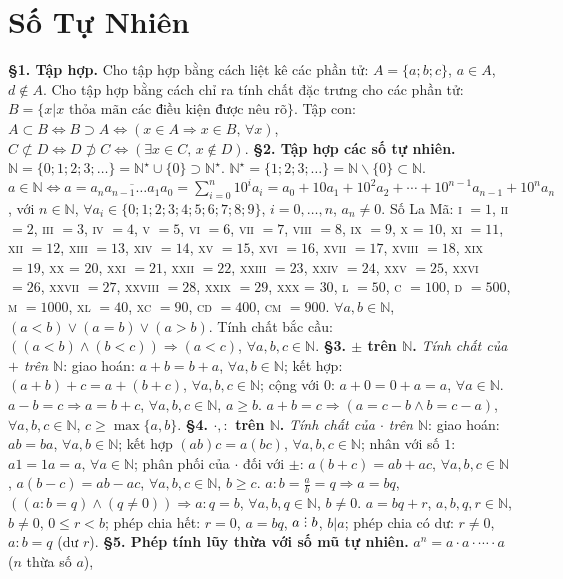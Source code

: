 \documentclass{article}
\DeclareRobustCommand{\divby}{%
	\mathrel{\vbox{\baselineskip.65ex\lineskiplimit0pt\hbox{.}\hbox{.}\hbox{.}}}%
}
\begin{document}
\section{Số Tự Nhiên}
\textbf{\S1. Tập hợp.} Cho tập hợp bằng cách liệt kê các phần tử: $A = \{a;b;c\}$, $a\in A$, $d\notin A$. Cho tập hợp bằng cách chỉ ra tính chất đặc trưng cho các phần tử: $B = \{x|x\mbox{ thỏa mãn các điều kiện được nêu rõ}\}$. Tập con: $A\subset B\Leftrightarrow B\supset A\Leftrightarrow(x\in A\Rightarrow x\in B,\,\forall x)$, $C\not\subset D\Leftrightarrow D\not\supset C\Leftrightarrow(\exists x\in C,\,x\notin D)$. \textbf{\S2. Tập hợp các số tự nhiên.} $\mathbb{N} = \{0;1;2;3;\ldots\} = \mathbb{N}^\star\cup\{0\}\supset\mathbb{N}^\star$. $\mathbb{N}^\star = \{1;2;3;\ldots\} = \mathbb{N}\backslash\{0\}\subset\mathbb{N}$. $a\in\mathbb{N}\Leftrightarrow a = \overline{a_na_{n-1}\ldots a_1a_0} = \sum_{i=0}^n 10^ia_i = a_0 + 10a_1 + 10^2a_2 + \cdots + 10^{n-1}a_{n-1} + 10^na_n$, với $n\in\mathbb{N}$, $\forall a_i\in\{0;1;2;3;4;5;6;7;8;9\}$, $i = 0,\ldots,n$, $a_n\ne 0$. Số La Mã: \textsc{i} $= 1$, \textsc{ii} $= 2$, \textsc{iii} $= 3$, \textsc{iv} $= 4$, \textsc{v} $= 5$, \textsc{vi} $= 6$, \textsc{vii} $= 7$, \textsc{viii} $= 8$, \textsc{ix} $= 9$, \textsc{x} = $10$, \textsc{xi} $= 11$, \textsc{xii} $= 12$, \textsc{xiii} $= 13$, \textsc{xiv} $= 14$, \textsc{xv} $= 15$, \textsc{xvi} $= 16$, \textsc{xvii} $= 17$, \textsc{xviii} $= 18$, \textsc{xix} $= 19$, \textsc{xx} = $20$, \textsc{xxi} $= 21$, \textsc{xxii} $= 22$, \textsc{xxiii} $= 23$, \textsc{xxiv} $= 24$, \textsc{xxv} $= 25$, \textsc{xxvi} $= 26$, \textsc{xxvii} $= 27$, \textsc{xxviii} $= 28$, \textsc{xxix} $= 29$, \textsc{xxx} = $30$, \textsc{l} $= 50$, \textsc{c} $= 100$, \textsc{d} $= 500$, \textsc{m} $= 1000$, \textsc{xl} $= 40$, \textsc{xc} $= 90$, \textsc{cd} $= 400$, \textsc{cm} $= 900$. $\forall a,b\in\mathbb{N}$, $(a < b)\lor(a = b)\lor(a > b)$. Tính chất bắc cầu: $((a < b)\land(b < c))\Rightarrow(a < c)$, $\forall a,b,c\in\mathbb{N}$. \textbf{\S3. $\boldsymbol{\pm}$ trên $\mathbb{N}$.} \textit{Tính chất của $+$ trên $\mathbb{N}$}: giao hoán: $a + b = b + a$, $\forall a,b\in\mathbb{N}$; kết hợp: $(a + b) + c = a + (b + c)$, $\forall a,b,c\in\mathbb{N}$; cộng với $0$: $a + 0 = 0 + a = a$, $\forall a\in\mathbb{N}$. $a - b = c\Rightarrow a = b + c$, $\forall a,b,c\in\mathbb{N}$, $a\ge b$. $a + b = c\Rightarrow(a = c - b\land b = c - a)$, $\forall a,b,c\in\mathbb{N}$, $c\ge\max\{a,b\}$. \textbf{\S4. $\boldsymbol{\cdot,:}$ trên $\mathbb{N}$.} \textit{Tính chất của $\cdot$ trên $\mathbb{N}$}: giao hoán: $ab = ba$, $\forall a,b\in\mathbb{N}$; kết hợp $(ab)c = a(bc)$, $\forall a,b,c\in\mathbb{N}$; nhân với số $1$: $a1 = 1a = a$, $\forall a\in\mathbb{N}$; phân phối của $\cdot$ đối với $\pm$: $a(b + c) = ab + ac$, $\forall a,b,c\in\mathbb{N}$, $a(b - c) = ab - ac$, $\forall a,b,c\in\mathbb{N}$, $b\ge c$. $a:b = \frac{a}{b} = q\Rightarrow a = bq$, $((a:b = q)\land(q\ne 0))\Rightarrow a:q = b$, $\forall a,b,q\in\mathbb{N}$, $b\ne 0$. $a = bq + r$, $a,b,q,r\in\mathbb{N}$, $b\ne 0$, $0\le r < b$; phép chia hết: $r = 0$, $a = bq$, $a\divby b$, $b|a$; phép chia có dư: $r\ne 0$, $a:b = q$ (dư $r$). \textbf{\S5. Phép  tính lũy thừa với số mũ tự nhiên.} $a^n = a\cdot a\cdot\cdots\cdot a$ ($n$ thừa số $a$), 
\end{document}
